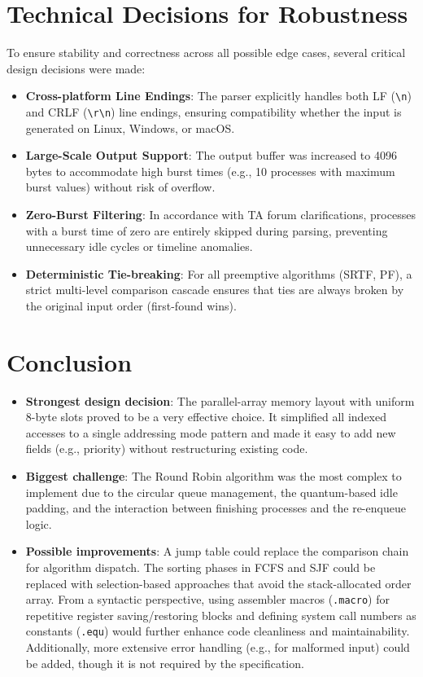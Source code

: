 \documentclass[a4paper,12pt]{article}
\begin{document}
\section*{Technical Decisions for Robustness}
To ensure stability and correctness across all possible edge cases, several critical design decisions were made:
\begin{itemize}
    \item \textbf{Cross-platform Line Endings}: The parser explicitly handles both LF (\texttt{\textbackslash n}) and CRLF (\texttt{\textbackslash r\textbackslash n}) line endings, ensuring compatibility whether the input is generated on Linux, Windows, or macOS.
    \item \textbf{Large-Scale Output Support}: The output buffer was increased to 4096 bytes to accommodate high burst times (e.g., 10 processes with maximum burst values) without risk of overflow.
    \item \textbf{Zero-Burst Filtering}: In accordance with TA forum clarifications, processes with a burst time of zero are entirely skipped during parsing, preventing unnecessary idle cycles or timeline anomalies.
    \item \textbf{Deterministic Tie-breaking}: For all preemptive algorithms (SRTF, PF), a strict multi-level comparison cascade ensures that ties are always broken by the original input order (first-found wins).
\end{itemize}

\section*{Conclusion}

\begin{itemize}
    \item \textbf{Strongest design decision}: The parallel-array memory layout with uniform 8-byte slots proved to be a very effective choice. It simplified all indexed accesses to a single addressing mode pattern and made it easy to add new fields (e.g., priority) without restructuring existing code.
    \item \textbf{Biggest challenge}: The Round Robin algorithm was the most complex to implement due to the circular queue management, the quantum-based idle padding, and the interaction between finishing processes and the re-enqueue logic.
    \item \textbf{Possible improvements}: A jump table could replace the comparison chain for algorithm dispatch. The sorting phases in FCFS and SJF could be replaced with selection-based approaches that avoid the stack-allocated order array. From a syntactic perspective, using assembler macros (\texttt{.macro}) for repetitive register saving/restoring blocks and defining system call numbers as constants (\texttt{.equ}) would further enhance code cleanliness and maintainability. Additionally, more extensive error handling (e.g., for malformed input) could be added, though it is not required by the specification.
\end{itemize}
\end{document}
